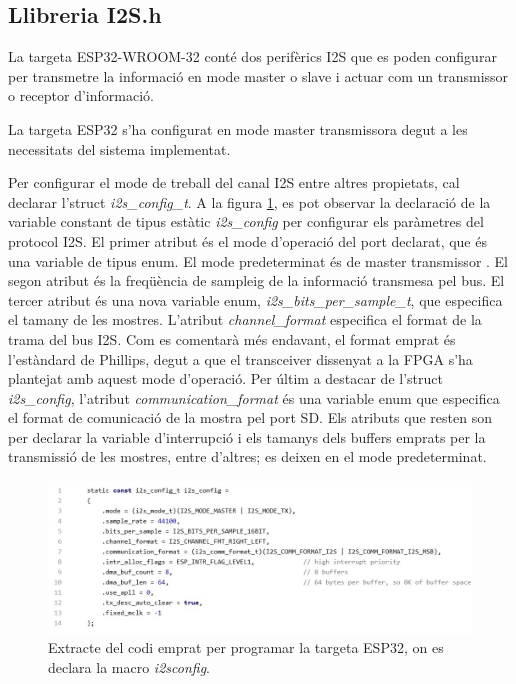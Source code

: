 \subsection{Llibreria I2S.h}
\par La targeta ESP32-WROOM-32 conté dos perifèrics I2S que es poden configurar per transmetre la informació en mode master o slave i actuar com un transmissor o receptor d'informació.
\par La targeta ESP32 s'ha configurat en mode master transmissora degut a les necessitats del sistema implementat.
\par Per configurar el mode de treball del canal I2S entre altres propietats, cal declarar l'struct \textit{i2s{\_}config{\_}t}. A la figura \ref{i2s_config_fig}, es pot observar la declaració de la variable constant de tipus estàtic \textit{i2s{\_}config} per configurar els paràmetres del protocol I2S. El primer atribut és el mode d'operació del port declarat, que és una variable de tipus enum. El mode predeterminat és de master transmissor \cite{I2SESP32code}. El segon atribut és la freqüència de sampleig de la informació transmesa pel bus. El tercer atribut és una nova variable enum, \textit{i2s{\_}bits{\_}per{\_}sample{\_}t}, que especifica el tamany de les mostres. L'atribut \textit{channel{\_}format} especifica el format de la trama del bus I2S. Com es comentarà més endavant, el format emprat és l'estàndard de Phillips, degut a que el transceiver dissenyat a la FPGA s'ha plantejat amb aquest mode d'operació. Per últim a destacar de l'struct \textit{i2s{\_}config}, l'atribut \textit{communication{\_}format} és una variable enum que especifica el format de comunicació de la mostra pel port SD. Els atributs que resten son per declarar la variable d'interrupció i els tamanys dels buffers emprats per la transmissió de les mostres, entre d'altres; es deixen en el mode predeterminat.

\begin{figure}[H]
    \centering
    \includegraphics[width=0.7\linewidth]{Images/codi_i2sconfig.jpeg}
    \caption{Extracte del codi emprat per programar la targeta ESP32, on es declara la macro \textit{i2s\textunderscore config}.}
    \label{i2s_config_fig}
\end{figure}

